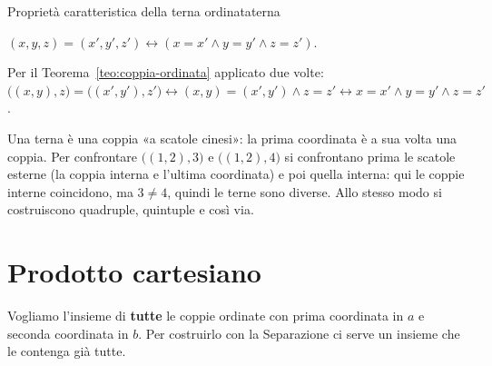 
\begin{concetto}
\begin{Corollario}{Proprietà caratteristica della terna ordinata}{terna}
    \begin{prerequisiti}
    \end{prerequisiti}
    $(x, y, z) = (x', y', z') \leftrightarrow (x = x' \wedge y = y' \wedge z = z')$.
\end{Corollario}
\begin{dimostrazione}
    Per il Teorema~\ref{teo:coppia-ordinata} applicato due volte:
    $\big((x,y),z\big) = \big((x',y'),z'\big) \leftrightarrow (x,y) = (x',y') \wedge z = z' \leftrightarrow x = x' \wedge y = y' \wedge z = z'$.
\end{dimostrazione}
\end{concetto}

\begin{spiegazione}
    Una terna è una coppia «a scatole cinesi»: la prima coordinata è a sua volta una coppia. Per confrontare $\big((1, 2), 3\big)$ e $\big((1, 2), 4\big)$
    si confrontano prima le scatole esterne (la coppia interna e l'ultima coordinata) e poi quella interna: qui le coppie interne coincidono, ma $3 \neq 4$,
    quindi le terne sono diverse. Allo stesso modo si costruiscono quadruple, quintuple e così via.
\end{spiegazione}


\section{Prodotto cartesiano}\label{sec:prodotto-cartesiano}

Vogliamo l'insieme di \textbf{tutte} le coppie ordinate con prima coordinata in $a$ e seconda coordinata in $b$.
Per costruirlo con la Separazione ci serve un insieme che le contenga già tutte.

